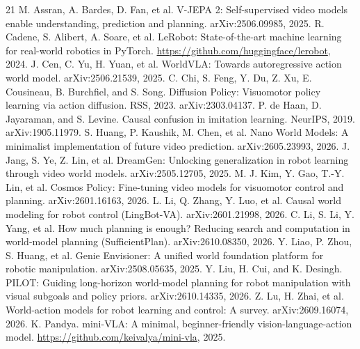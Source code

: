\documentclass[11pt]{article}
\begin{document}
{\small
\begin{thebibliography}{21}
 M. Assran, A. Bardes, D. Fan, et al. V-JEPA 2: Self-supervised video models enable understanding, prediction and planning. arXiv:2506.09985, 2025.
 R. Cadene, S. Alibert, A. Soare, et al. LeRobot: State-of-the-art machine learning for real-world robotics in PyTorch. \url{https://github.com/huggingface/lerobot}, 2024.
 J. Cen, C. Yu, H. Yuan, et al. WorldVLA: Towards autoregressive action world model. arXiv:2506.21539, 2025.
 C. Chi, S. Feng, Y. Du, Z. Xu, E. Cousineau, B. Burchfiel, and S. Song. Diffusion Policy: Visuomotor policy learning via action diffusion. RSS, 2023. arXiv:2303.04137.
 P. de Haan, D. Jayaraman, and S. Levine. Causal confusion in imitation learning. NeurIPS, 2019. arXiv:1905.11979.
 S. Huang, P. Kaushik, M. Chen, et al. Nano World Models: A minimalist implementation of future video prediction. arXiv:2605.23993, 2026.
 J. Jang, S. Ye, Z. Lin, et al. DreamGen: Unlocking generalization in robot learning through video world models. arXiv:2505.12705, 2025.
 M. J. Kim, Y. Gao, T.-Y. Lin, et al. Cosmos Policy: Fine-tuning video models for visuomotor control and planning. arXiv:2601.16163, 2026.
 L. Li, Q. Zhang, Y. Luo, et al. Causal world modeling for robot control (LingBot-VA). arXiv:2601.21998, 2026.
 C. Li, S. Li, Y. Yang, et al. How much planning is enough? Reducing search and computation in world-model planning (SufficientPlan). arXiv:2610.08350, 2026.
 Y. Liao, P. Zhou, S. Huang, et al. Genie Envisioner: A unified world foundation platform for robotic manipulation. arXiv:2508.05635, 2025.
 Y. Liu, H. Cui, and K. Desingh. PILOT: Guiding long-horizon world-model planning for robot manipulation with visual subgoals and policy priors. arXiv:2610.14335, 2026.
 Z. Lu, H. Zhai, et al. World-action models for robot learning and control: A survey. arXiv:2609.16074, 2026.
 K. Pandya. mini-VLA: A minimal, beginner-friendly vision-language-action model. \url{https://github.com/keivalya/mini-vla}, 2025.

\end{thebibliography}}
\end{document}
